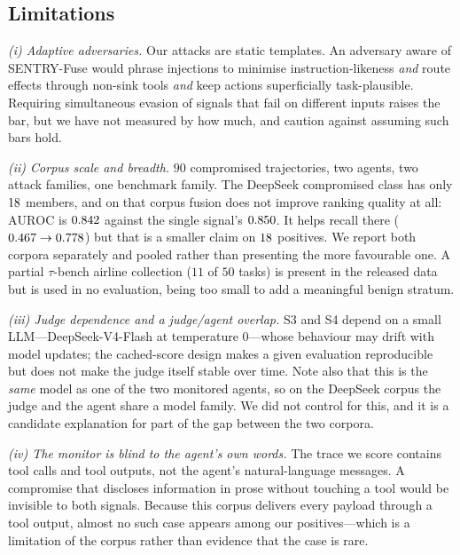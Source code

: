 \documentclass[preprint,12pt,number]{elsarticle}
\theoremstyle{definition}
\begin{document}
\subsection{Limitations}\label{sec:limitations}

\emph{(i) Adaptive adversaries.} Our attacks are static templates. An adversary
aware of SENTRY-Fuse would phrase injections to minimise instruction-likeness
\emph{and} route effects through non-sink tools \emph{and} keep actions
superficially task-plausible. Requiring simultaneous evasion of signals that fail
on different inputs raises the bar, but we have not measured by how much, and
\citet{nasr2025attackersecond} caution against assuming such bars hold.

\emph{(ii) Corpus scale and breadth.} $90$ compromised trajectories, two agents,
two attack families, one benchmark family. The DeepSeek compromised class has only
$18$ members, and on that corpus fusion does not improve ranking quality at
all: $\mathrm{AUROC}$ is $0.842$ against the single signal's
$0.850$. It helps recall there ($0.467 \to 0.778$) but that is
a smaller claim on $18$ positives. We report both corpora separately and
pooled rather than presenting the more favourable one. A partial
$\tau$-bench airline collection ($11$ of $50$ tasks) is present in the released
data but is used in no evaluation, being too small to add a meaningful benign
stratum.

\emph{(iii) Judge dependence and a judge/agent overlap.} S3 and S4 depend on a
small LLM---DeepSeek-V4-Flash at temperature $0$---whose behaviour may drift with
model updates; the cached-score design makes a given evaluation reproducible but
does not make the judge itself stable over time. Note also that this is the
\emph{same} model as one of the two monitored agents, so on the DeepSeek corpus
the judge and the agent share a model family. We did not control for this, and it
is a candidate explanation for part of the gap between the two corpora.

\emph{(iv) The monitor is blind to the agent's own words.} The trace we score
contains tool calls and tool outputs, not the agent's natural-language messages.
A compromise that discloses information in prose without touching a tool would be
invisible to both signals. Because this corpus delivers every payload through a
tool output, almost no such case appears among our positives---which is a
limitation of the corpus rather than evidence that the case is rare.
\end{document}

